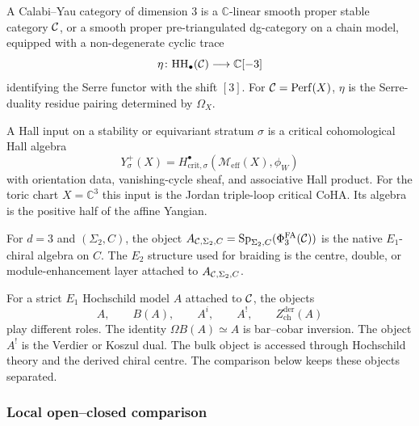 \begin{definition}
\label{def:cy3-category}
A Calabi--Yau category of dimension $3$ is a $\mathbb C$-linear smooth
proper stable category $\mathcal{C}$, or a smooth proper pre-triangulated
dg-category on a chain model, equipped with a non-degenerate cyclic trace
\[
  \eta\colon \mathrm{HH}_\bullet(\mathcal{C})\longrightarrow \mathbb C[-3]
\]
identifying the Serre functor with the shift $[3]$. For
$\mathcal{C}=\mathrm{Perf}(X)$, $\eta$ is the Serre-duality residue pairing determined
by $\Omega_X$.
\end{definition}

\begin{definition}
\label{def:hall-input}
A Hall input on a stability or equivariant stratum $\sigma$ is a
critical cohomological Hall algebra
\[
  Y^+_\sigma(X)
  =
  H^\bullet_{\mathrm{crit},\sigma}
  (\mathcal M_{\mathrm{eff}}(X),\phi_W)
\]
with orientation data, vanishing-cycle sheaf, and associative Hall
product. For the toric chart $X=\mathbb C^3$ this input is the
Jordan triple-loop critical CoHA. Its algebra is the positive half
of the affine Yangian.
\end{definition}

\begin{definition}
\label{def:specialised-chiral-output}
For $d=3$ and $(\Sigma_2,C)$, the object
$A_{\mathcal{C},\Sigma_2,C}=\mathrm{Sp}_{\Sigma_2,C}(\Phi^{\mathrm{FA}}_3(\mathcal{C}))$ is the native
$E_1$-chiral algebra on $C$. The $E_2$ structure used for braiding is
the centre, double, or module-enhancement layer attached to
$A_{\mathcal{C},\Sigma_2,C}$.
\end{definition}

\begin{remark}
\label{rmk:five-objects-separated}
For a strict $E_1$ Hochschild model $A$ attached to $\mathcal{C}$, the objects
\[
  A,\qquad B(A),\qquad A^i,\qquad A^!,\qquad
  Z^{\mathrm{der}}_{\mathrm{ch}}(A)
\]
play different roles. The identity $\Omega B(A)\simeq A$ is bar--cobar
inversion. The object $A^!$ is the Verdier or Koszul dual. The bulk
object is accessed through Hochschild theory and the derived chiral
centre. The comparison below keeps these objects separated.
\end{remark}

\subsubsection{Local open--closed comparison}
\label{wn:subsubsec:local-open-closed-comparison}

